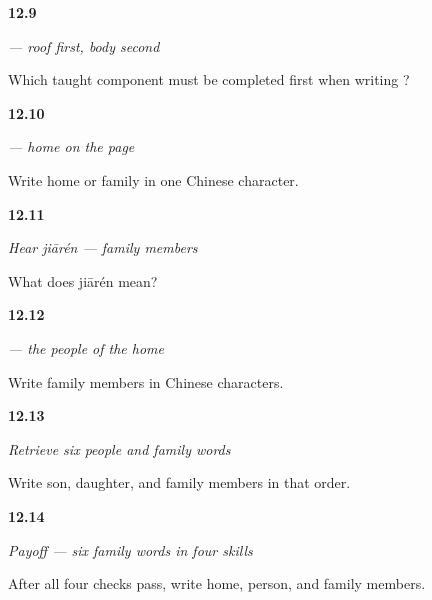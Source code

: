 \noindent\begin{minipage}[t]{\linewidth}
\raggedright
\hypertarget{review-ZH-W12-jia-build}{\textbf{12.9}} \emph{ — roof first, body second}\par
\small Which taught component must be completed first when writing ?
\end{minipage}\par\medskip

\noindent\begin{minipage}[t]{\linewidth}
\raggedright
\hypertarget{review-ZH-C12-jia-write}{\textbf{12.10}} \emph{ — home on the page}\par
\small Write home or family in one Chinese character.
\end{minipage}\par\medskip

\noindent\begin{minipage}[t]{\linewidth}
\raggedright
\hypertarget{review-ZH-C12-hear-jiaren-meaning}{\textbf{12.11}} \emph{Hear \emph{jiārén} — family members}\par
\small What does jiārén mean?
\end{minipage}\par\medskip

\noindent\begin{minipage}[t]{\linewidth}
\raggedright
\hypertarget{review-ZH-C12-jiaren-write}{\textbf{12.12}} \emph{ — the people of the home}\par
\small Write family members in Chinese characters.
\end{minipage}\par\medskip

\noindent\begin{minipage}[t]{\linewidth}
\raggedright
\hypertarget{review-ZH-R12-family-six-recall}{\textbf{12.13}} \emph{Retrieve six people and family words}\par
\small Write son, daughter, and family members in that order.
\end{minipage}\par\medskip

\noindent\begin{minipage}[t]{\linewidth}
\raggedright
\hypertarget{review-ZH-C12-practice-family-payoff}{\textbf{12.14}} \emph{Payoff — six family words in four skills}\par
\small After all four checks pass, write home, person, and family members.
\end{minipage}\par\medskip

